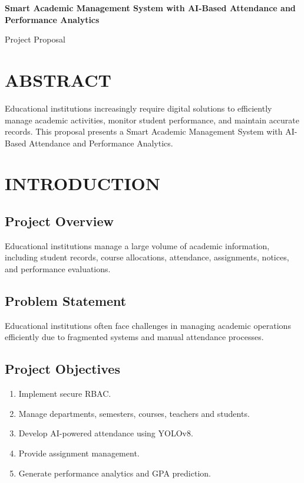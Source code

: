 \documentclass[12pt,a4paper]{report}
\begin{document}
\begin{titlepage}
\centering
{\Huge\bfseries Smart Academic Management System with AI-Based Attendance and Performance Analytics\par}
\vfill
Project Proposal
\vfill
\end{titlepage}

\chapter*{ABSTRACT}
Educational institutions increasingly require digital solutions to efficiently manage academic activities, monitor student performance, and maintain accurate records. This proposal presents a Smart Academic Management System with AI-Based Attendance and Performance Analytics.

\tableofcontents
\newpage


\chapter{INTRODUCTION}
\section{Project Overview}
Educational institutions manage a large volume of academic information, including student records, course allocations, attendance, assignments, notices, and performance evaluations.

\section{Problem Statement}
Educational institutions often face challenges in managing academic operations efficiently due to fragmented systems and manual attendance processes.

\section{Project Objectives}
\begin{enumerate}
\item Implement secure RBAC.
\item Manage departments, semesters, courses, teachers and students.
\item Develop AI-powered attendance using YOLOv8.
\item Provide assignment management.
\item Generate performance analytics and GPA prediction.
\end{enumerate}
\end{document}
